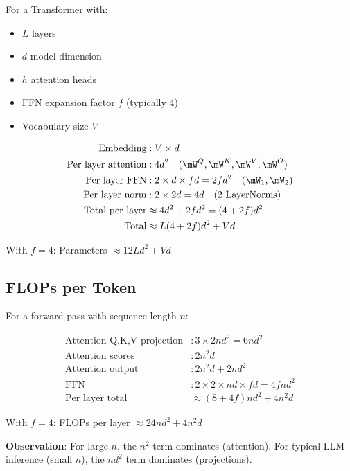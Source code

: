 For a Transformer with:
\begin{itemize}
    \item $L$ layers
    \item $d$ model dimension
    \item $h$ attention heads
    \item FFN expansion factor $f$ (typically 4)
    \item Vocabulary size $V$
\end{itemize}

\begin{align}
\text{Embedding} &: V \times d \\
\text{Per layer attention} &: 4d^2 \quad (\mW^Q, \mW^K, \mW^V, \mW^O) \\
\text{Per layer FFN} &: 2 \times d \times fd = 2fd^2 \quad (\mW_1, \mW_2) \\
\text{Per layer norm} &: 2 \times 2d = 4d \quad (\text{2 LayerNorms}) \\
\text{Total per layer} &\approx 4d^2 + 2fd^2 = (4 + 2f)d^2 \\
\text{Total} &\approx L(4 + 2f)d^2 + Vd
\end{align}

With $f=4$: Parameters $\approx 12Ld^2 + Vd$

\subsection{FLOPs per Token}

For a forward pass with sequence length $n$:

\begin{align}
\text{Attention Q,K,V projection} &: 3 \times 2nd^2 = 6nd^2 \\
\text{Attention scores} &: 2n^2d \\
\text{Attention output} &: 2n^2d + 2nd^2 \\
\text{FFN} &: 2 \times 2 \times nd \times fd = 4fnd^2 \\
\text{Per layer total} &\approx (8 + 4f)nd^2 + 4n^2d
\end{align}

With $f=4$: FLOPs per layer $\approx 24nd^2 + 4n^2d$

\textbf{Observation}: For large $n$, the $n^2$ term dominates (attention). For typical LLM inference (small $n$), the $nd^2$ term dominates (projections).


